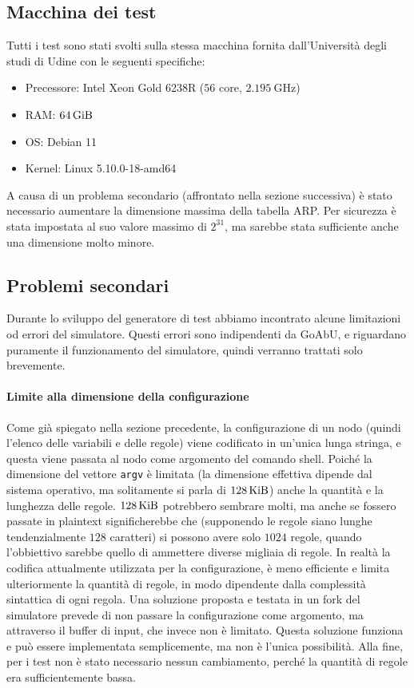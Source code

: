 \documentclass[12pt, a4paper]{article}
\begin{document}
\subsection{Macchina dei test}

Tutti i test sono stati svolti sulla stessa macchina fornita dall'Università degli studi di Udine con le seguenti specifiche:

\begin{itemize}
    \item Precessore: Intel Xeon Gold 6238R ($56$ core, $\qty{2.195}{\giga\hertz}$)
    \item RAM: $\qty{64}{\gibi\byte}$
    \item OS: Debian 11
    \item Kernel: Linux 5.10.0-18-amd64
\end{itemize}

A causa di un problema secondario (affrontato nella sezione successiva) è stato necessario aumentare la dimensione massima della tabella ARP. Per sicurezza è stata impostata al suo valore massimo di $2^{31}$, ma sarebbe stata sufficiente anche una dimensione molto minore.

\subsection{Problemi secondari}

Durante lo sviluppo del generatore di test abbiamo incontrato alcune limitazioni od errori del simulatore. Questi errori sono indipendenti da GoAbU, e riguardano puramente il funzionamento del simulatore, quindi verranno trattati solo brevemente.

\paragraph{Limite alla dimensione della configurazione}

Come già spiegato nella sezione precedente, la configurazione di un nodo (quindi l'elenco delle variabili e delle regole) viene codificato in un'unica lunga stringa, e questa viene passata al nodo come argomento del comando shell. Poiché la dimensione del vettore \lstinline{argv} è limitata (la dimensione effettiva dipende dal sistema operativo, ma solitamente si parla di \ensuremath{\qty{128}{\kibi\byte}}) anche la quantità e la lunghezza delle regole.
\ensuremath{\qty{128}{\kibi\byte}} potrebbero sembrare molti, ma anche se fossero passate in plaintext significherebbe che (supponendo le regole siano lunghe tendenzialmente $128$ caratteri) si possono avere solo $1024$ regole, quando l'obbiettivo sarebbe quello di ammettere diverse migliaia di regole. In realtà la codifica attualmente utilizzata per la configurazione, è meno efficiente e limita ulteriormente la quantità di regole, in modo dipendente dalla complessità sintattica di ogni regola.
Una soluzione proposta e testata in un fork del simulatore prevede di non passare la configurazione come argomento, ma attraverso il buffer di input, che invece non è limitato. Questa soluzione funziona e può essere implementata semplicemente, ma non è l'unica possibilità.
Alla fine, per i test non è stato necessario nessun cambiamento, perché la quantità di regole era sufficientemente bassa.
\end{document}
